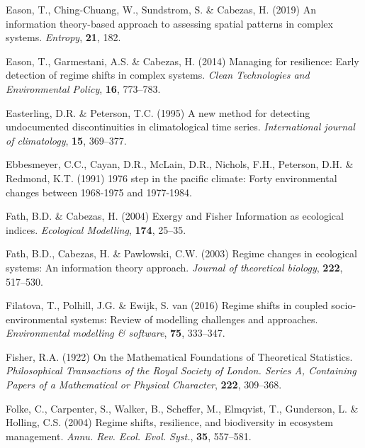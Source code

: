 \documentclass[12pt,twoside,openany]{reedthesis}
\begin{document}
\leavevmode\hypertarget{ref-eason2019information}{}%
Eason, T., Ching-Chuang, W., Sundstrom, S. \& Cabezas, H. (2019) An information theory-based approach to assessing spatial patterns in complex systems. \emph{Entropy}, \textbf{21}, 182.

\leavevmode\hypertarget{ref-eason2014managing}{}%
Eason, T., Garmestani, A.S. \& Cabezas, H. (2014) Managing for resilience: Early detection of regime shifts in complex systems. \emph{Clean Technologies and Environmental Policy}, \textbf{16}, 773--783.

\leavevmode\hypertarget{ref-easterling1995new}{}%
Easterling, D.R. \& Peterson, T.C. (1995) A new method for detecting undocumented discontinuities in climatological time series. \emph{International journal of climatology}, \textbf{15}, 369--377.

\leavevmode\hypertarget{ref-ebbesmeyer19911976}{}%
Ebbesmeyer, C.C., Cayan, D.R., McLain, D.R., Nichols, F.H., Peterson, D.H. \& Redmond, K.T. (1991) 1976 step in the pacific climate: Forty environmental changes between 1968-1975 and 1977-1984.

\leavevmode\hypertarget{ref-fath_exergy_2004}{}%
Fath, B.D. \& Cabezas, H. (2004) Exergy and Fisher Information as ecological indices. \emph{Ecological Modelling}, \textbf{174}, 25--35.

\leavevmode\hypertarget{ref-fath_regime_2003}{}%
Fath, B.D., Cabezas, H. \& Pawlowski, C.W. (2003) Regime changes in ecological systems: An information theory approach. \emph{Journal of theoretical biology}, \textbf{222}, 517--530.

\leavevmode\hypertarget{ref-filatova2016regime}{}%
Filatova, T., Polhill, J.G. \& Ewijk, S. van (2016) Regime shifts in coupled socio-environmental systems: Review of modelling challenges and approaches. \emph{Environmental modelling \& software}, \textbf{75}, 333--347.

\leavevmode\hypertarget{ref-fisher_mathematical_1922}{}%
Fisher, R.A. (1922) On the Mathematical Foundations of Theoretical Statistics. \emph{Philosophical Transactions of the Royal Society of London. Series A, Containing Papers of a Mathematical or Physical Character}, \textbf{222}, 309--368.

\leavevmode\hypertarget{ref-folke2004regime}{}%
Folke, C., Carpenter, S., Walker, B., Scheffer, M., Elmqvist, T., Gunderson, L. \& Holling, C.S. (2004) Regime shifts, resilience, and biodiversity in ecosystem management. \emph{Annu. Rev. Ecol. Evol. Syst.}, \textbf{35}, 557--581.
\end{document}
